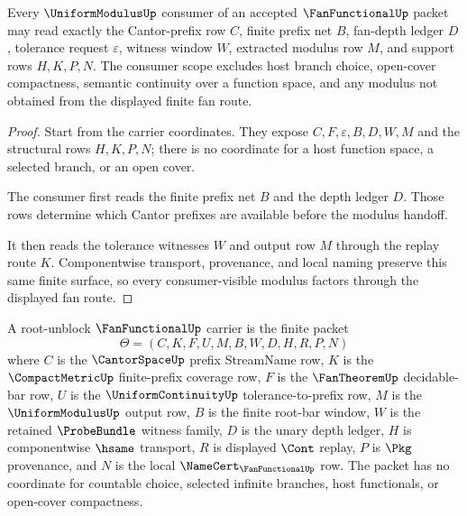 \begin{theorem}
\label{thm:fanfunctional-uniformmodulus-consumer-scope}
Every $\UniformModulusUp$ consumer of an accepted $\FanFunctionalUp$ packet
may read exactly the Cantor-prefix row $C$, finite prefix net $B$, fan-depth
ledger $D$, tolerance request $\varepsilon$, witness window $W$, extracted
modulus row $M$, and support rows $H,K,P,N$. The consumer scope excludes host
branch choice, open-cover compactness, semantic continuity over a function
space, and any modulus not obtained from the displayed finite fan route.
\end{theorem}
\begin{proof}
Start from the carrier coordinates. They expose $C,F,\varepsilon,B,D,W,M$ and
the structural rows $H,K,P,N$; there is no coordinate for a host function
space, a selected branch, or an open cover.

The consumer first reads the finite prefix net $B$ and the depth ledger $D$.
Those rows determine which Cantor prefixes are available before the modulus
handoff.

It then reads the tolerance witnesses $W$ and output row $M$ through the replay
route $K$. Componentwise transport, provenance, and local naming preserve this
same finite surface, so every consumer-visible modulus factors through the
displayed fan route.
\end{proof}

\begin{definition}
\label{def:fanfunctional-root-bar-carrier}
A root-unblock $\FanFunctionalUp$ carrier is the finite packet
$$
\Theta=(C,K,F,U,M,B,W,D,H,R,P,N)
$$
where $C$ is the $\CantorSpaceUp$ prefix StreamName row, $K$ is the $\CompactMetricUp$ finite-prefix coverage row, $F$ is the $\FanTheoremUp$ decidable-bar row, $U$ is the $\UniformContinuityUp$ tolerance-to-prefix row, $M$ is the $\UniformModulusUp$ output row, $B$ is the finite root-bar window, $W$ is the retained $\ProbeBundle$ witness family, $D$ is the unary depth ledger, $H$ is componentwise $\hsame$ transport, $R$ is displayed $\Cont$ replay, $P$ is $\Pkg$ provenance, and $N$ is the local $\NameCert_{\FanFunctionalUp}$ row. The packet has no coordinate for countable choice, selected infinite branches, host functionals, or open-cover compactness.
\end{definition}

